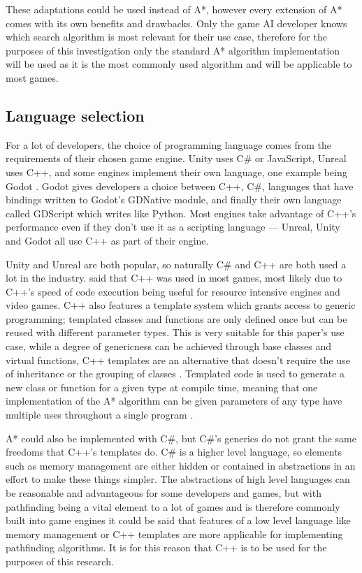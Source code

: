 \documentclass[11pt, a4paper]{report}
\begin{document}
These adaptations could be used instead of A*, however every extension of A* comes with its own benefits and drawbacks. Only the game AI developer knows which search algorithm is most relevant for their use case, therefore for the purposes of this investigation only the standard A* algorithm implementation will be used as it is the most commonly used algorithm and will be applicable to most games.

\subsection{Language selection}
\label{subsec:languageSelection}

For a lot of developers, the choice of programming language comes from the requirements of their chosen game engine. Unity \parencite{Unity} uses C\# or JavaScript, Unreal \parencite{Unreal} uses C++, and some engines implement their own language, one example being Godot \parencite{Godot}. Godot gives developers a choice between C++, C\#, languages that have bindings written to Godot's GDNative module, and finally their own language called GDScript which writes like Python. Most engines take advantage of C++'s performance even if they don't use it as a scripting language --- Unreal, Unity and Godot all use C++ as part of their engine. 

Unity \parencite{Unity} and Unreal \parencite{Unreal} are both popular, so naturally C\# and C++ are both used a lot in the industry. \citeauthor{blow2004game} \parencite*[30]{blow2004game} said that C++ was used in most games, most likely due to C++'s speed of code execution being useful for resource intensive engines and video games. C++ also features a template system which grants access to generic programming; templated classes and functions are only defined once but can be reused with different parameter types. This is very suitable for this paper's use case, while a degree of genericness can be achieved through base classes and virtual functions, C++ templates are an alternative that doesn't require the use of inheritance or the grouping of classes \parencite[117]{higgins2002generic}. Templated code is used to generate a new class or function for a given type at compile time, meaning that one implementation of the A* algorithm can be given parameters of any type have multiple uses throughout a single program \parencite[120]{higgins2002generic}.

A* could also be implemented with C\#, but C\#'s generics do not grant the same freedoms that C++'s templates do. C\# is a higher level language, so elements such as memory management are either hidden or contained in abstractions in an effort to make these things simpler. The abstractions of high level languages can be reasonable and advantageous for some developers and games, but with pathfinding being a vital element to a lot of games and is therefore commonly built into game engines it could be said that features of a low level language like memory management or C++ templates are more applicable for implementing pathfinding algorithms. It is for this reason that C++ is to be used for the purposes of this research.
\end{document}
